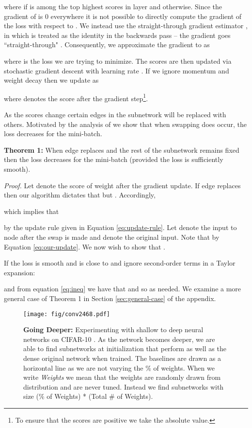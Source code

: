 \documentclass[10pt,twocolumn,letterpaper]{article}
\begin{document}
where  if  is among the top  highest scores in layer  and  otherwise. Since the gradient of  is 0 everywhere it is not possible to directly compute the gradient of the loss with respect to . We instead use the straight-through gradient estimator \cite{ste}, in which  is treated as the identity in the backwards pass -- the gradient goes ``straight-through" . Consequently, we approximate the gradient to  as

where  is the loss we are trying to minimize. The scores  are then updated via stochastic gradient descent with learning rate . If we ignore momentum and weight decay \cite{wd} then we update  as

where  denotes the score after the gradient step\footnote{To ensure that the scores are positive we take the absolute value.}.

As the scores change certain edges in the subnetwork will be replaced with others. Motivated by the analysis of \cite{dnw} we show that when swapping does occur, the loss decreases for the mini-batch. 

\noindent \textbf{Theorem 1:} When edge  replaces  and the rest of the subnetwork remains fixed then the loss decreases for the mini-batch (provided the loss is sufficiently smooth).

\noindent \textit{Proof.} Let  denote the score of weight  after the gradient update. If edge  replaces  then our algorithm dictates that  but . Accordingly,

which implies that

by the update rule given in Equation \ref{eq:update-rule}.
Let  denote the input to node  after the swap is made and  denote the original input. Note that  by Equation \ref{eq:our-update}. We now wish to show that . 

If the loss is smooth and  is close to  and ignore second-order terms in a Taylor expansion:

and from equation \ref{eq:ineq} we have that  and so  as needed. We examine a more general case of Theorem 1 in Section \ref{sec:general-case} of the appendix.

\begin{figure*}[t!]
    \centering
    \texttt{[image: fig/conv2468.pdf]}
    \caption{\textbf{Going Deeper:} Experimenting with shallow to deep neural networks on CIFAR-10 \cite{cifar}. As the network becomes deeper, we are able to find subnetworks at initialization that perform as well as the dense original network when trained. The baselines are drawn as a horizontal line as we are not varying the \% of weights. When we write \textit{Weights}  we mean that the weights are randomly drawn from distribution  and are never tuned. Instead we find subnetworks with size (\% of Weights) * (Total \# of Weights).}
    \label{fig:conv2468}
\end{figure*}
\end{document}
